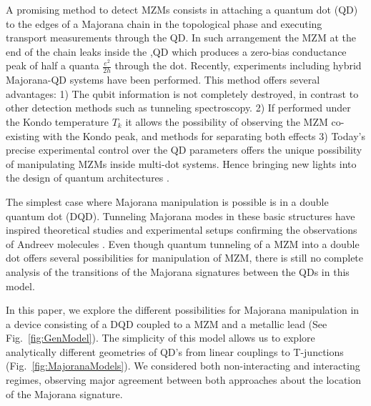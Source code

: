 \documentclass[showpacs,aps,prb,reprint,superscriptaddress]{revtex4-1}
\newcommand{\TS}[1]{{$\rightarrow$ {\sl#1}}}
\begin{document}

A promising method to detect MZMs consists in attaching a quantum dot (QD) to the edges of a Majorana chain in the topological phase and executing transport measurements through the QD. \cite{liu_detecting_2011}  In such arrangement the MZM at the end of the chain leaks inside the ,QD \cite{vernek_subtle_2014} which produces a zero-bias conductance peak of half a quanta $\frac{e^{2}}{2h}$ through the dot. Recently, experiments including hybrid Majorana-QD systems have been performed. \cite{deng_majorana_2016} This method offers several advantages: 1) The qubit information  is not completely destroyed, in contrast to other detection methods such as tunneling spectroscopy. 2) If performed under the  Kondo temperature $T_k$ it allows the possibility of observing the  MZM co-existing with the Kondo peak, \cite{lee_kondo_2013,ruiz-tijerina_interaction_2015,gorski_interplay_2018} and methods for separating both effects 3) Today's precise experimental control over the QD parameters offers the unique possibility of manipulating MZMs inside multi-dot systems. Hence bringing new lights into the design of quantum architectures \cite{barkeshli_physical_2015,karzig_scalable_2017}. 





 The simplest case where Majorana manipulation is possible is in a double quantum dot (DQD). Tunneling Majorana modes in these basic structures have inspired theoretical studies \cite{silva_andreev_2016,ivanov_coherent_2017} and experimental setups confirming the observations of Andreev molecules \cite{su_andreev_2017}. Even though quantum tunneling of a MZM into a double dot offers several possibilities for manipulation of MZM,  there is still no complete analysis of the transitions of the Majorana signatures between the QDs in this model. 
 
 
 In this paper, we explore the different possibilities for Majorana manipulation in a device consisting of a DQD coupled to a MZM and a metallic lead (See Fig.\ \ref{fig:GenModel}). The simplicity of this model allows us to explore analytically different geometries of QD's from linear couplings to T-junctions (Fig.\ \ref{fig:MajoranaModels}). We considered both non-interacting and interacting regimes, observing major agreement between both approaches about the location of the Majorana signature.
 
\end{document}
